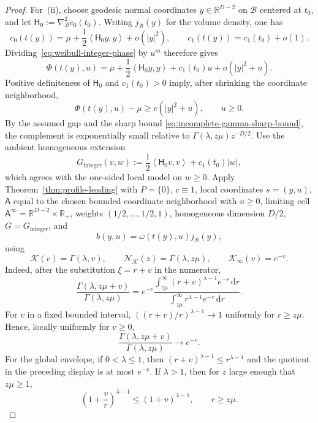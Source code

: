 \documentclass[11pt]{amsart}
\numberwithin{equation}{section}
\theoremstyle{definition}
\theoremstyle{remark}
\newcommand{\R}{\mathbb{R}}
\newcommand{\dd}{\,\mathrm{d}}
\newcommand{\Afib}{\mathsf{A}}
\newcommand{\inner}[2]{\left\langle #1,#2\right\rangle}
\begin{document}
\begin{proof}
For~(ii), choose geodesic normal coordinates
$y\in\R^{D-2}$ on $\mathcal B$ centered at $t_0$, and let
$\mathsf H_0:=\nabla_{\mathcal B}^2c_0(t_0)$.  Writing $j_{\mathcal B}(y)$ for the
volume density, one has
\[
 c_0(t(y))=\mu+\frac12\inner{\mathsf H_0y}{y}+o(|y|^2),
 \qquad
 c_1(t(y))=c_1(t_0)+o(1).
\]
Dividing~\eqref{eq:weibull-integer-phase} by $u^m$ therefore gives
\begin{equation}\label{eq:weibull-integer-local-model}
 \Phi(t(y),u)
 =\mu+\frac12\inner{\mathsf H_0y}{y}+c_1(t_0)u
 +o(|y|^2+u).
\end{equation}
Positive definiteness of $\mathsf H_0$ and $c_1(t_0)>0$ imply, after shrinking
the coordinate neighborhood,
\begin{equation}\label{eq:weibull-integer-local-lower-bound}
 \Phi(t(y),u)-\mu\ge c(|y|^2+u),
 \qquad u\ge0.
\end{equation}
By the assumed gap and the sharp bound
\eqref{eq:incomplete-gamma-sharp-bound}, the complement is exponentially
small relative to $\Gamma(\lambda,z\mu)z^{-D/2}$.  Use the
ambient homogeneous extension
\[
 G_{\mathrm{integer}}(v,w)
 :=\frac12\inner{\mathsf H_0v}{v}+c_1(t_0)|w|,
\]
which agrees with the one-sided local model on $w\ge0$.  Apply
Theorem~\ref{thm:profile-leading} with $P=\{0\}$, $c\equiv1$, local
coordinates $s=(y,u)$, $\Afib$ equal to the chosen bounded coordinate
neighborhood with $u\ge0$, limiting cell
$\Afib^\infty=\R^{D-2}\times\R_+$, weights $(1/2,\ldots,1/2,1)$, homogeneous dimension
$D/2$, $G=G_{\mathrm{integer}}$, and
\[
 b(y,u)=\omega(t(y),u)j_{\mathcal B}(y),
\]
using
\[
 \mathcal K(v)=\Gamma(\lambda,v),
 \qquad
 \mathcal N_{\mathcal K}(z)=\Gamma(\lambda,z\mu),
 \qquad
 \mathcal K_\infty(v)=e^{-v}.
\]
Indeed, after the substitution $\xi=r+v$ in the numerator,
\[
 \frac{\Gamma(\lambda,z\mu+v)}{\Gamma(\lambda,z\mu)}
 =e^{-v}
 \frac{\int_{z\mu}^\infty(r+v)^{\lambda-1}e^{-r}\dd r}
      {\int_{z\mu}^\infty r^{\lambda-1}e^{-r}\dd r}.
\]
For $v$ in a fixed bounded interval,
$((r+v)/r)^{\lambda-1}\to1$ uniformly for $r\ge z\mu$.  Hence, locally
uniformly for $v\ge0$,
\begin{equation}\label{eq:weibull-shifted-profile-limit}
 \frac{\Gamma(\lambda,z\mu+v)}{\Gamma(\lambda,z\mu)}
 \longrightarrow e^{-v}.
\end{equation}
For the global envelope, if $0<\lambda\le1$, then
$(r+v)^{\lambda-1}\le r^{\lambda-1}$ and the quotient in the preceding
display is at most $e^{-v}$.  If $\lambda>1$, then for $z$ large enough that
$z\mu\ge1$,
\[
 \left(1+\frac vr\right)^{\lambda-1}
 \le (1+v)^{\lambda-1},\qquad r\ge z\mu.
\]
\end{proof}
\end{document}
